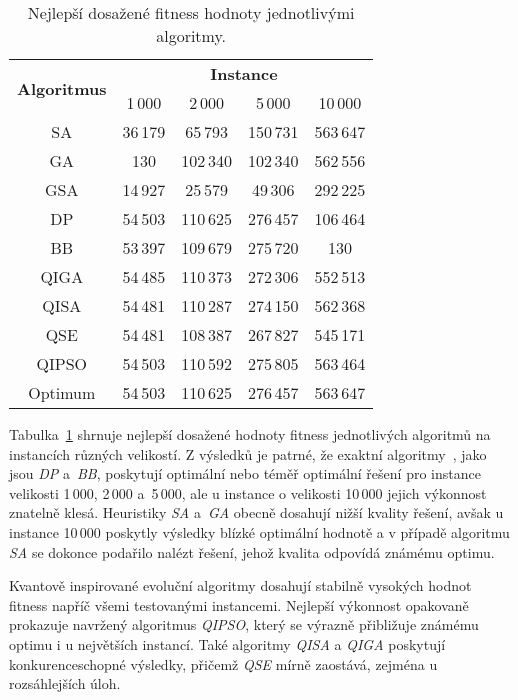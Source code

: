 \begin{table}[ht]
    \centering
    \begin{tabular}{c c c c c}
        \toprule
        \multirow{2}{*}{\textbf{Algoritmus}} &
        \multicolumn{4}{c}{\textbf{Instance}} \\
        \cmidrule(lr){2-5}
              & 1\,000  & 2\,000   & 5\,000   & 10\,000 \\
        \midrule
        SA    & 36\,179 &  65\,793 & 150\,731 & 563\,647 \\[1ex]
        GA    &     130 & 102\,340 & 102\,340 & 562\,556 \\[1ex]
        GSA   & 14\,927 &  25\,579 &  49\,306 & 292\,225 \\[1ex]
        DP    & 54\,503 & 110\,625 & 276\,457 & 106\,464 \\[1ex]
        BB    & 53\,397 & 109\,679 & 275\,720 &      130 \\[1ex]
        QIGA  & 54\,485 & 110\,373 & 272\,306 & 552\,513 \\[1ex]
        QISA  & 54\,481 & 110\,287 & 274\,150 & 562\,368 \\[1ex]
        QSE   & 54\,481 & 108\,387 & 267\,827 & 545\,171 \\[1ex]
        QIPSO & 54\,503 & 110\,592 & 275\,805 & 563\,464 \\
        \midrule
        Optimum & 54\,503 & 110\,625 & 276\,457 & 563\,647 \\
        \bottomrule
    \end{tabular}
    \caption{Nejlepší dosažené fitness hodnoty jednotlivými algoritmy.}
    \label{tab:alg-comparison}
\end{table}

Tabulka~\ref{tab:alg-comparison} shrnuje nejlepší dosažené hodnoty fitness jednotlivých algoritmů na instancích různých velikostí.
Z výsledků je patrné, že exaktní algoritmy~\cite{compare}, jako jsou \emph{DP} a~\emph{BB}, poskytují optimální nebo téměř optimální řešení pro instance velikosti 1\,000, 2\,000 a~5\,000, ale u instance o velikosti 10\,000 jejich výkonnost znatelně klesá. 
Heuristiky \emph{SA} a~\emph{GA} obecně dosahují nižší kvality řešení, avšak u instance 10\,000 poskytly výsledky blízké optimální hodnotě a v případě algoritmu \emph{SA} se dokonce podařilo nalézt řešení, jehož kvalita odpovídá známému optimu.

Kvantově inspirované evoluční algoritmy dosahují stabilně vysokých hodnot fitness napříč všemi testovanými instancemi. 
Nejlepší výkonnost opakovaně prokazuje navržený algoritmus \emph{QIPSO}, který se výrazně přibližuje známému optimu i u největších instancí.
Také algoritmy \emph{QISA} a \emph{QIGA} poskytují konkurenceschopné výsledky, přičemž \emph{QSE} mírně zaostává, zejména u rozsáhlejších úloh.
